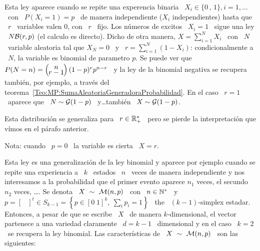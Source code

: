 Esta ley aparece cuando se repite una experencia binaria \ $X_i \in \{ 0 \, , \,
1 \},  i = 1, \ldots$  \ con \ $P(X_i=1)  = p$ \ de  manera independiente ($X_i$
independientes) hasta  que \  $r$ \  variables valen 0,  con \  $r$ \  fijo. Los
n\'umeros de  excitos \ $X_i =  1$ \ sigue una  ley \ $N\mathcal{B}(r,p)$  (el calculo es
directo).  Dicho de otra  manera, $X = \sum_{i=1}^N X_i$ \ con  \ $N$ \ variable
aleatoria tal que $X_N = 0$ \ y \ $r = \sum_{i=1}^N (1-X_i)$: condicionalmente a
\ $N$, la variable es binomial de parametro $p$.  Se puede ver que \ $P(N = n) =
\bino{n}{r-1} (1-p)^r  p^{n-r}$ \ y la  ley de la binomial  negativa se recupera
tambi\'en,          por         ejemplo,         a          trav\'es         del
teorema~\ref{Teo:MP:SumaAleatoriaGeneradoraProbabilidad}. En el caso \ $r = 1$ \
aparece que \ $N \sim \mathcal{G}(1-p)$ \ y\ldots tambi\'en \ $X \sim \mathcal{G}(1-p)$.
%

Esta distribuci\'on se  generaliza para \ $r \in \mathbb{R}_+^*$ \  pero se pierde la
interpretaci\'on que v\'imos en el p\'arafo anterior.

Nota: cuando \ $p = 0$ \ la variable es cierta \ $X = r$.



\label{Sssec:MP:Multinomial}

Esta ley es una generalizaci\'on de la ley binomial y aparece por ejemplo cuando
se  repite  una  experiencia  a  \  $k$  \ estados  \  $n$  \  veces  de  manera
independiente y nos  interesamos a la probabilidad que  el primer evento aparece
$n_1$ veces, el secundo $n_2$ veces, \ldots.  Se denota \ $X \ \sim \ \M(n,p)$ \
con \ $n \in  \mathbb{N}^*$ \ y \ $p = \begin{bmatrix}  \end{bmatrix}^t \in S_{k-1} =
\left\{  p \in  [  0 \; 1  ]^k,  \: \sum_i  p_i  = 1  \right\}$  \ the  \
$(k-1)$-simplex estadar. Entonces,  a pesar de que se escribe \  $X$ \ de manera
$k$-dimensional, el  vector partenece a  una variedad claramente  \ $d =  k-1$ \
dimensional  y en  el  caso \  $k  = 2$  \  se recupera  la  ley binomial.   Las
caracter\'isticas de \ $X \ \sim \ \M(n,p)$ \ son las siguientes:

